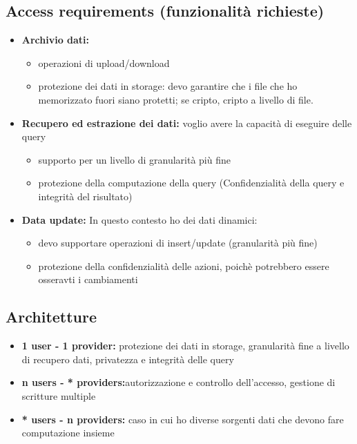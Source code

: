 \documentclass{report}
\begin{document}
\subsection{Access requirements (funzionalità richieste)}
\begin{itemize}
    \item \textbf{Archivio dati:}
    \begin{itemize}
        \item operazioni di upload/download
        \item protezione dei dati in storage: devo garantire che i file che ho memorizzato fuori siano protetti;
        se cripto, cripto a livello di file.
    \end{itemize}
    \item \textbf{Recupero ed estrazione dei dati:}
    voglio avere la capacità di eseguire delle query
    \begin{itemize}
        \item supporto per un livello di granularità più fine
        \item protezione della computazione della query (Confidenzialità della query e integrità del risultato)
    \end{itemize}
    \item \textbf{Data update:}
    In questo contesto ho dei dati dinamici: 
    \begin{itemize}
        \item devo supportare operazioni di insert/update (granularità più fine)
        \item protezione della confidenzialità delle azioni, poichè potrebbero essere osseravti i cambiamenti
    \end{itemize}
\end{itemize}

\subsection{Architetture}

\begin{itemize}
    \item \textbf{1 user - 1 provider: }protezione dei dati in storage, granularità fine a livello di recupero dati, privatezza e integrità delle query
    \item \textbf{n users - * providers:}autorizzazione e controllo dell'accesso, gestione di scritture multiple
    \item \textbf{* users - n providers:} caso in cui ho diverse sorgenti dati che devono fare computazione insieme
\end{itemize}
\end{document}
